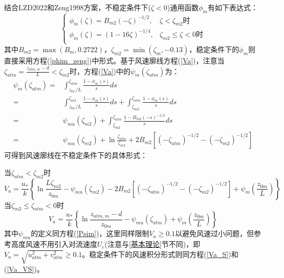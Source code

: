 结合LZD2022和Zeng1998方案，不稳定条件下($\zeta<0$)通用函数$\phi_{m}$有如下表达式：
\begin{equation}
\left\{\begin{array}{lr}\phi_{m}(\zeta)=B_{m2}(-\zeta)^{-1/2}, & \zeta<\zeta_{m2} \text {时} \\
      \phi_{m}(\zeta)=(1-16 \zeta)^{-1/4}, & \zeta_{m2} \leq \zeta<0 \text {时} \\
       \end{array}\right.
\end{equation}
其中$B_{m2}=\max(B_{m},0.2722)$，$\zeta_{m2}=\min(\zeta_{m},-0.13)$，稳定条件下的$\phi_{m}$则直接采用方程(\ref{phim_zeng})中形式。基于风速廓线方程(\ref{Va})，注意当
$\zeta_{atm}=\frac{z_{atm,m}-d}{L}<\zeta_{m2}$时，方程(\ref{Va})中的$\psi_{m}\left(\zeta_{atm}\right)$为：
\begin{align}
\psi_{m}\left(\zeta_{atm}\right) =& \int_{{z_{0x}}/{L}}^{\zeta_{atm}} \frac{1-\phi_{m}(s)}{s} d s  \nonumber \\
 =& \int_{{z_{0x}}/{L}}^{\zeta_{m2}} \frac{1-\phi_{m}(s)}{s} d s + \int_{\zeta_{m2}}^{\zeta_{atm}} \frac{1-\phi_{m}(s)}{s} d s  \nonumber \\
 =& \psi_{mu}(\zeta_{m2}) + \int_{\zeta_{m2}}^{\zeta_{atm}} \frac{1-B_{m2}(-s)^{-1/2}}{s} d s  \nonumber \\
 =& \psi_{mu}(\zeta_{m2}) + \ln \frac{\zeta_{atm}}{\zeta_{m2}} + 2B_{m2}\left[(-\zeta_{atm})^{-1/2}-(-\zeta_{m2})^{-1/2}\right]
\end{align}
可得到风速廓线在不稳定条件下的具体形式：

\noindent 当$\zeta_{atm}<\zeta_{m2}$时
\begin{equation}\label{Va_U_LZD1}
V_{a}=\frac{u_{*}}{k}\left\{\ln \frac{L\zeta_{m2}}{z_{0 m}}-\psi_{mu}\left(\zeta_{m2}\right)-2B_{m2}\left[(-\zeta_{atm})^{-1/2}-(-\zeta_{m2})^{-1/2}\right]+\psi_{m}\left(\frac{z_{0 m}}{L}\right)\right\}
\end{equation}
\noindent 当$ \zeta_{m2} \leq \zeta_{atm}<0$时
\begin{equation}\label{Va_U_LZD2}
V_{a}=\frac{u_{*}}{k}\left\{\ln \frac{z_{atm, m}-d}{z_{0 m}}-\psi_{mu}\left(\zeta_{atm}\right)+\psi_{m}\left(\frac{z_{0 m}}{L}\right)\right\}
\end{equation}
其中$\psi_{mu}$的定义同方程(\ref{Psim})，这里同样限制$V_a\geq0.1$以避免风速过小问题，但参考高度风速不用引入对流速度$U_c$(注意与\ref{基本理论}节不同)，即
$V_{a}=\sqrt{u_{atm}^{2}+v_{atm}^{2}} \geq 0.1$。稳定条件下的风速积分形式则同方程(\ref{Va_S})和(\ref{Va_VS})。

